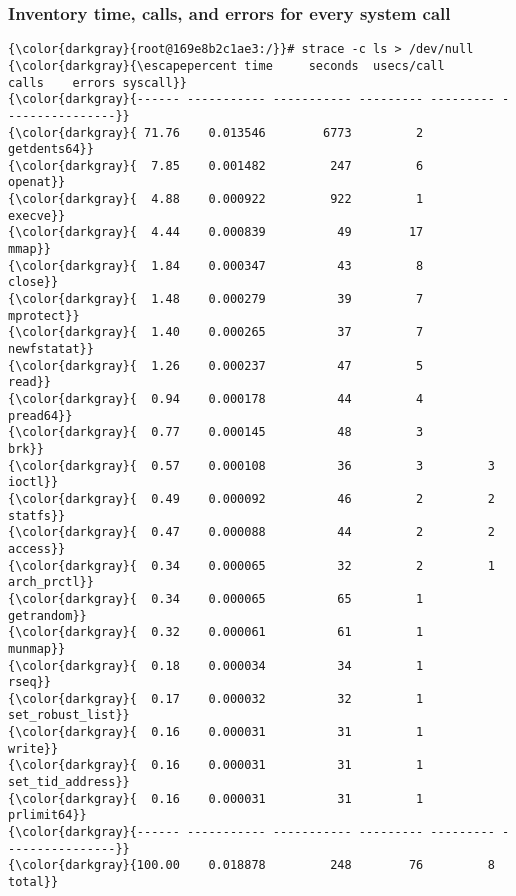 		\subsubsection{Inventory time, calls, and errors for every system call}
{\footnotesize{
\begin{Verbatim}[commandchars=\\\{\}]
{\color{darkgray}{root@169e8b2c1ae3:/}}# strace -c ls > /dev/null
{\color{darkgray}{\escapepercent time     seconds  usecs/call     calls    errors syscall}}
{\color{darkgray}{------ ----------- ----------- --------- --------- ----------------}}
{\color{darkgray}{ 71.76    0.013546        6773         2           getdents64}}
{\color{darkgray}{  7.85    0.001482         247         6           openat}}
{\color{darkgray}{  4.88    0.000922         922         1           execve}}
{\color{darkgray}{  4.44    0.000839          49        17           mmap}}
{\color{darkgray}{  1.84    0.000347          43         8           close}}
{\color{darkgray}{  1.48    0.000279          39         7           mprotect}}
{\color{darkgray}{  1.40    0.000265          37         7           newfstatat}}
{\color{darkgray}{  1.26    0.000237          47         5           read}}
{\color{darkgray}{  0.94    0.000178          44         4           pread64}}
{\color{darkgray}{  0.77    0.000145          48         3           brk}}
{\color{darkgray}{  0.57    0.000108          36         3         3 ioctl}}
{\color{darkgray}{  0.49    0.000092          46         2         2 statfs}}
{\color{darkgray}{  0.47    0.000088          44         2         2 access}}
{\color{darkgray}{  0.34    0.000065          32         2         1 arch_prctl}}
{\color{darkgray}{  0.34    0.000065          65         1           getrandom}}
{\color{darkgray}{  0.32    0.000061          61         1           munmap}}
{\color{darkgray}{  0.18    0.000034          34         1           rseq}}
{\color{darkgray}{  0.17    0.000032          32         1           set_robust_list}}
{\color{darkgray}{  0.16    0.000031          31         1           write}}
{\color{darkgray}{  0.16    0.000031          31         1           set_tid_address}}
{\color{darkgray}{  0.16    0.000031          31         1           prlimit64}}
{\color{darkgray}{------ ----------- ----------- --------- --------- ----------------}}
{\color{darkgray}{100.00    0.018878         248        76         8 total}}
\end{Verbatim}
}}

